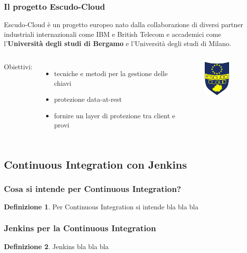 \documentclass{beamer}
\theoremstyle{definition}
\newtheorem{definizione}{Definizione}
\theoremstyle{plain}
\begin{document}
\begin{frame}
\frametitle{Il progetto Escudo-Cloud}
\alert{Escudo-Cloud} è un progetto europeo nato dalla collaborazione di diversi partner industriali internazionali come IBM e British Telecom e accademici come l'\textbf{Università degli studi di Bergamo} e l'Università degli studi di Milano.\\
\vspace*{1cm}
\begin{columns}
Obiettivi:
\begin{itemize}
\item
tecniche e metodi per la gestione delle chiavi
\item
protezione data-at-rest
\item
fornire un layer di protezione tra client e provi
\end{itemize}
\begin{figure}[!h]
	\begin{center}
\includegraphics[width=1.5cm]{ESCUDO-CLOUD.png}
\end{center}
\end{figure}
\end{columns}
\end{frame}
\subsection{Continuous Integration con Jenkins}
\begin{frame}
\frametitle{Cosa si intende per Continuous Integration?}
\begin{definizione}
Per \alert{Continuous Integration} si intende  bla bla bla
\end{definizione}
\end{frame}


\begin{frame}
\frametitle{Jenkins per la Continuous Integration}
\begin{definizione}
\alert{Jenkins} bla bla bla
\end{definizione}
\end{frame}
\end{document}
